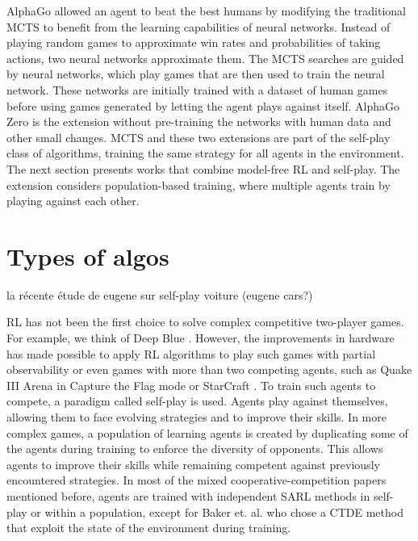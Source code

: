 AlphaGo \citep{silver2016mastering} allowed an agent to beat the best humans by modifying the traditional MCTS to benefit from the learning capabilities of neural networks.
Instead of playing random games to approximate win rates and probabilities of taking actions, two neural networks approximate them.
The MCTS searches are guided by neural networks, which play games that are then used to train the neural network.
These networks are initially trained with a dataset of human games before using games generated by letting the agent plays against itself.
AlphaGo Zero \citep{silver2017mastering} is the extension without pre-training the networks with human data and other small changes.
MCTS and these two extensions are part of the self-play class of algorithms, training the same strategy for all agents in the environment.
The next section presents works that combine model-free RL and self-play.
The extension considers population-based training, where multiple agents train by playing against each other.

\section{Types of algos}\label{sec:ch6_algo}



la récente étude de eugene sur self-play voiture (eugene cars?)

RL has not been the first choice to solve complex competitive two-player games.
For example, we think of Deep Blue \citep{campbell2002deep}.
However, the improvements in hardware has made possible to apply RL algorithms to play such games with partial observability \citep{silver2018general} or even games with more than two competing agents, such as Quake III Arena in Capture the Flag mode \citep{jaderberg2019human} or StarCraft \citep{vinyals2019grandmaster}.
To train such agents to compete, a paradigm called self-play is used.
Agents play against themselves, allowing them to face evolving strategies and to improve their skills.
In more complex games, a population of learning agents is created by duplicating some of the agents during training to enforce the diversity of opponents.
This allows agents to improve their skills while remaining competent against previously encountered strategies.
In most of the mixed cooperative-competition papers mentioned before, agents are trained with independent SARL methods in self-play or within a population, except for Baker et. al. \cite{baker2019emergent} who chose a CTDE method that exploit the state of the environment during training.


